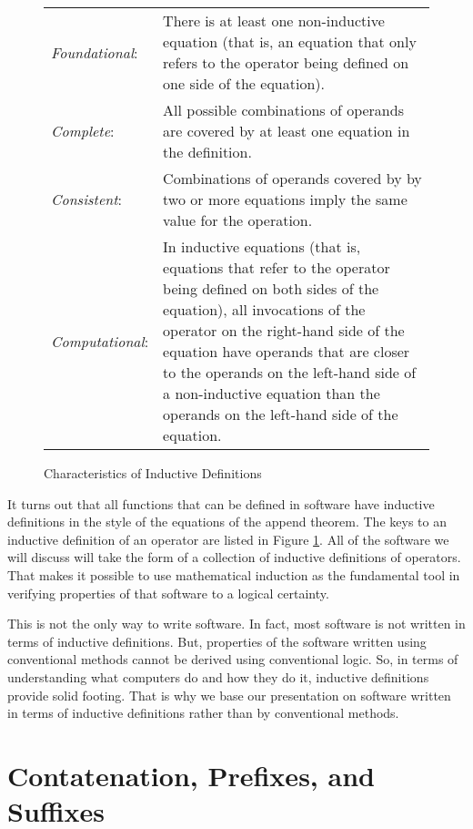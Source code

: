 \begin{figure}
\begin{center}
\begin{tabular}{lp{3.5in}}
\emph{Foundational}: & There is at least one non-inductive equation (that is, an equation that only refers to the operator being defined on one side of the equation). \\
\emph{Complete}: & All possible combinations of operands are covered by at least one equation in the definition. \\
\emph{Consistent}: & Combinations of operands covered by by two or more equations imply the same value for the operation. \\
\emph{Computational}: & In inductive equations (that is, equations that refer to the operator being defined on both sides of the equation), all invocations of the operator on the right-hand side of the equation have operands that are closer to the operands on the left-hand side of a non-inductive equation than the operands on the left-hand side of the equation.
\end{tabular}
\caption{Characteristics of Inductive Definitions}
\end{center}
\label{fig:inductive-def-keys}
\end{figure}

It turns out that all functions that can be defined in software have inductive definitions in the style of the equations of the append theorem. The keys to an inductive definition of an operator are listed in Figure \ref{fig:inductive-def-keys}. All of the software we will discuss will take the form of a collection of inductive definitions of operators. That makes it possible to use mathematical induction as the fundamental tool in verifying properties of that software to a logical certainty.

This is not the only way to write software. In fact, most software is not written in terms of inductive definitions. But, properties of the software written using conventional methods cannot be derived using conventional logic. So, in terms of understanding what computers do and how they do it, inductive definitions provide solid footing. That is why we base our presentation on software written in terms of inductive definitions rather than by conventional methods.


\section{Contatenation, Prefixes, and Suffixes}
\label{sec:append-prefix-suffix}

